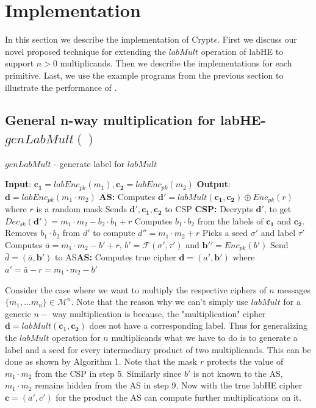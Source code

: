 \section{Implementation}\label{sec:implementaion}
\label{implementation}
In this section we describe the implementation of Crypt$\epsilon$. First we discuss our novel proposed technique for extending the $labMult$ operation of \textsf{labHE} to support $n > 0$ multiplicands. Then we describe the implementations for each primitive. Last, we use the example programs from the previous section to illustrate the performance of \system.

\subsection{\textbf{General n-way multiplication for \textsf{labHE}- $genLabMult()$}}\label{genlab}
\begin{algorithm}
\caption{$genLabMult$ - generate label for $labMult$}
\begin{algorithmic}[1]
\STATEx
\textbf{Input}: $\mathbf{c_1}=labEnc_{pk}(m_1),\mathbf{c_2}=labEnc_{pk}(m_2)$
\STATEx \textbf{Output}: $\mathbf{d}=labEnc_{pk}(m_1\cdot m_2)$
\STATEx \textbf{\textsf{AS}:} \STATE Computes $\textbf{d}'=labMult(\mathbf{c_1,c_2}) \oplus Enc_{pk}(r)$ where $r$ is a random mask \STATE Sends $\mathbf{d'},\mathbf{c_1},\mathbf{c_2}$ to \textsf{CSP}
\STATEx \textbf{\textsf{CSP}:}
\STATE Decrypts $\mathbf{d'}$, to get $Dec_{sk}(\mathbf{d}')=m_1\cdot m_2 -b_2\cdot b_1 + r$
\STATE Computes $b_1 \cdot b_2$ from the labels of $\mathbf{c_1}$ and $\mathbf{c_2}$.
\STATE Removes $b_1\cdot b_2$ from $d'$ to compute $d''=m_1\cdot m_2+r$
\STATE Picks a seed $\sigma'$ and label $\tau'$
\STATE Computes $\bar{a}=m_1\cdot m_2 -b' +r$, $b'=\mathcal{F}(\sigma',\tau')$ and $\mathbf{b'}'=Enc_{pk}(b')$
\STATE Send $\bar{d}=(\bar{a},\mathbf{b'})$ to \textsf{AS}\STATEx \textbf{\textsf{AS}:}
\STATE Computes true cipher $\mathbf{d}=(a',\mathbf{b}')$ where $a'=\bar{a}-r=m_1\cdot m_2 - b'$
 \end{algorithmic}
\end{algorithm}
Consider the case where we want to multiply the respective ciphers of  $n$ messages $\{m_1,...m_n\} \in \mathcal{M}^n$. Note that the reason why we can't simply use $labMult$ for a generic $n-$ way multiplication is because, the "multiplication" cipher $\mathbf{d}=labMult(\mathbf{c_1},\mathbf{c_2})$ does not have  a corresponding label. Thus for generalizing the $labMult$ operation for $n$ multiplicands what we have to do is to generate a label and a seed for every intermediary product of two multiplicands. This can be done as shown by Algorithm 1. Note that the mask $r$ protects the value of $m_1\cdot m_2$ from the \textsf{CSP} in step 5. Similarly since $b'$ is not known to the \textsf{AS}, $m_1\cdot m_2$ remains hidden from the \textsf{AS} in step 9. Now with the true \textsf{labHE} cipher $\mathbf{c}=(a',c')$ for the product the \textsf{AS} can compute further multiplications on it.
